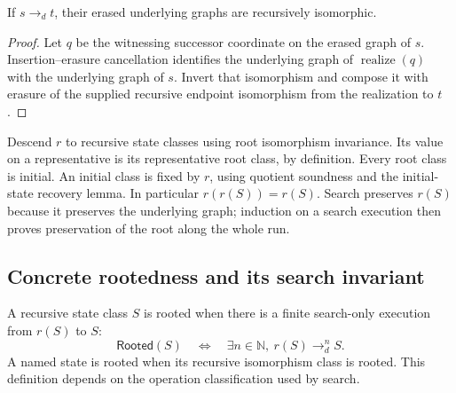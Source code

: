 \begin{lemma}
If $s\longrightarrow_d t$, their erased underlying graphs are recursively
isomorphic.
\end{lemma}
\begin{proof}
Let $q$ be the witnessing successor coordinate on the erased graph of $s$.
Insertion--erasure cancellation identifies the underlying graph of
$\operatorname{realize}(q)$ with the underlying graph of $s$. Invert that
isomorphism and compose it with erasure of the supplied recursive endpoint
isomorphism from the realization to $t$.
\end{proof}

Descend $r$ to recursive state classes using root isomorphism invariance.
Its value on a representative is its representative root class, by definition.
Every root class is initial. An initial class is fixed by $r$, using quotient
soundness and the initial-state recovery lemma. In particular $r(r(S))=r(S)$.
Search preserves $r(S)$ because it preserves the underlying graph; induction
on a search execution then proves preservation of the root along the whole run.

\subsection{Concrete rootedness and its search invariant}
\begin{definition}
A recursive state class $S$ is rooted when there is a finite search-only
execution from $r(S)$ to $S$:
\[
 \mathsf{Rooted}(S)\quad\Longleftrightarrow\quad
 \exists n\in\mathbb N,\ r(S)\longrightarrow_d^n S.
\]
A named state is rooted when its recursive isomorphism class is rooted.
This definition depends on the operation classification used by search.
\end{definition}

